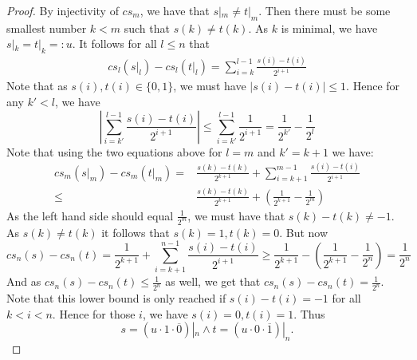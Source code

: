 \begin{proof}
  By injectivity of $cs_m$, we have that $s|_m \neq t|_m$. 
  Then there must be some smallest number $k<m$ such that 
  $s(k) \neq t(k)$. As $k$ is minimal, we have $s|_k = t|_k = : u$. 
  It follows for all $l\leq n$ that 
  \begin{align}
    cs_l(s|_l)-cs_l(t|_l) 
    = \sum\limits_{i = k}^{l-1} \frac{s(i)-t(i)}{2^{i+1}}
  \end{align}
  Note that as $s(i),t(i) \in \{0,1\}$, we must have %
  $|s(i)-t(i)| \leq 1$. 
  Hence for any $k'<l$, we have 
  \begin{equation}
    \left|\sum\limits_{i = k'}^{l-1} \frac{s(i)-t(i)}{2^{i+1}}\right|
    \leq 
    \sum\limits_{i = k'}^{l-1} \frac{1}{2^{i+1}}
    = 
    \frac{1}{2^{k'}} - \frac{1}{2^{l}}
  \end{equation}
  Note that using the two equations above for $l=m$ and $k'=k+1$ we have:
  \begin{align}
    cs_m(s|_m) -cs_m(t|_m) 
    =&
    \frac{s(k)-t(k)}{2^{k+1}} + \sum\limits_{i = k+1}^{m-1} \frac{s(i)-t(i)}{2^{i+1}} \\
    \leq& 
    \frac{s(k)-t(k)}{2^{k+1}} + \left(\frac{1}{2^{k+1}} - \frac{1}{2^{m}}\right)
  \end{align}
  As the left hand side should equal $\frac{1}{2^m}$,
  we must have that $s(k)-t(k) \neq -1$. 
  As $s(k) \neq t(k)$ it follows that $s(k) = 1, t(k) = 0$.
  But now 
  \begin{equation}
    cs_n(s) -cs_n(t) 
    =
    \frac{1}{2^{k+1}} + \sum\limits_{i = k+1}^{n-1} \frac{s(i)-t(i)}{2^{i+1}}
    \geq 
    \frac{1}{2^{k+1}} - \left(\frac{1}{2^{k+1}} - \frac{1}{2^n} \right)
    =
    \frac{1}{2^{n}}
  \end{equation}
  And as $cs_n(s)-cs_n(t) \leq \frac{1}{2^n}$ as well, we get that 
  $cs_n(s)-cs_n(t) = \frac{1}{2^n}$. 
  Note that this lower bound is only reached if $s(i)-t(i) = -1$ for all $k<i<n$. 
  Hence for those $i$, we have $s(i) = 0, t(i) = 1$. 
  Thus 
  \begin{equation}
    s = (u \cdot 1\cdot \overline 0) |_n \wedge 
    t = (u \cdot 0\cdot \overline 1) |_n.
  \end{equation}
\end{proof}

